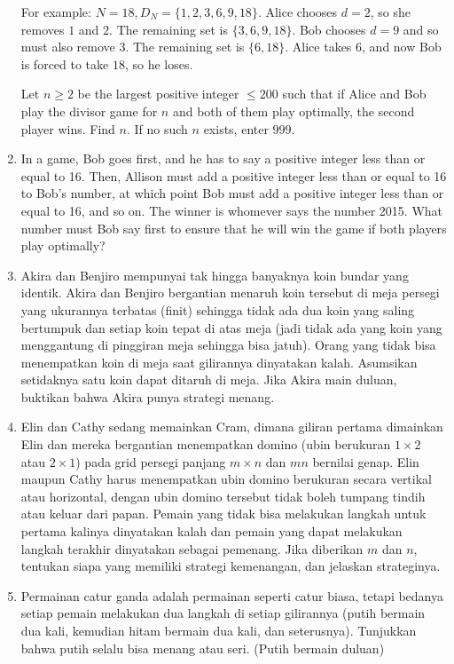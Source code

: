 \documentclass[11pt]{scrartcl}
\begin{document}
\begin{enumerate}[resume]
    For example: $ N = 18, D_N = \{ 1,2,3,6,9,18 \} $. Alice chooses $ d=2 $, so she removes $ 1 $ and $ 2 $. The remaining set is $ \{3,6,9,18\} $. Bob chooses $ d = 9 $ and so must also remove $ 3 $. The remaining set is $ \{6,18\} $. Alice takes $ 6 $, and now Bob is forced to take $ 18 $, so he loses.

    Let $ n \ge 2 $ be the largest positive integer $ \le 200 $ such that if Alice and Bob play the divisor game for $ n $ and both of them play optimally, the second player wins. Find $ n $. If no such $ n $ exists, enter $ 999 $.

    \item In a game, Bob goes first, and he has to say a positive integer less than or equal to 16. Then, Allison must add a positive integer less than or equal to 16 to Bob’s number, at which point Bob must add a positive integer less than or equal to 16, and so on. The winner is whomever says the number 2015. What number must Bob say first to ensure that he will win the game if both players play optimally?
    
\item Akira dan Benjiro mempunyai tak hingga banyaknya koin bundar yang identik. Akira dan Benjiro bergantian menaruh koin tersebut di meja persegi yang ukurannya terbatas (finit) sehingga tidak ada dua koin yang saling bertumpuk dan setiap koin tepat di atas meja (jadi tidak ada yang koin yang menggantung di pinggiran meja sehingga bisa jatuh). Orang yang tidak bisa menempatkan koin di meja saat gilirannya dinyatakan kalah. Asumsikan setidaknya satu koin dapat ditaruh di meja. Jika Akira main duluan, buktikan bahwa Akira punya strategi menang.


\item Elin dan Cathy sedang memainkan Cram, dimana giliran pertama dimainkan Elin dan mereka bergantian menempatkan domino (ubin berukuran $1 \times 2$ atau $2 \times 1$) pada grid persegi panjang $m \times n$ dan $mn$ bernilai genap. Elin maupun Cathy harus menempatkan ubin domino berukuran secara vertikal atau horizontal, dengan ubin domino tersebut tidak boleh tumpang tindih atau keluar dari papan. Pemain yang tidak bisa melakukan langkah untuk pertama kalinya dinyatakan kalah dan pemain yang dapat melakukan langkah terakhir dinyatakan sebagai pemenang. Jika diberikan $m$ dan $n$, tentukan siapa yang memiliki strategi kemenangan, dan jelaskan strateginya.


\item Permainan catur ganda adalah permainan seperti catur biasa, tetapi bedanya setiap pemain melakukan dua langkah di setiap gilirannya (putih bermain dua kali, kemudian hitam bermain dua kali, dan seterusnya). Tunjukkan bahwa putih selalu bisa menang atau seri. (Putih bermain duluan)



\end{enumerate}
\end{document}
